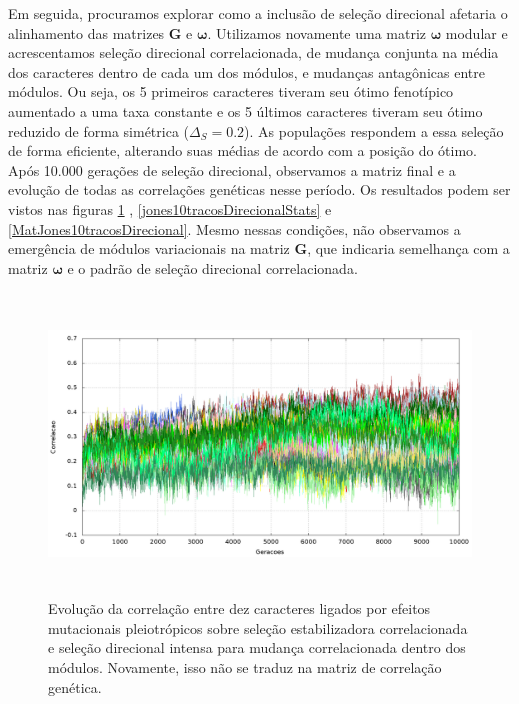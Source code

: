 Em seguida, procuramos explorar como a inclusão de seleção direcional afetaria o
alinhamento das matrizes $\mathbf{G}$ e $\pmb{\omega}$.
Utilizamos novamente uma matriz $\pmb{\omega}$ modular e acrescentamos seleção
direcional correlacionada, de mudança conjunta na média dos caracteres
dentro de cada um dos módulos, e mudanças antagônicas entre módulos.
Ou seja, os 5 primeiros caracteres tiveram seu ótimo fenotípico aumentado a
uma taxa constante e os 5 últimos caracteres tiveram seu ótimo reduzido de
forma simétrica ($\Delta_S=0.2$).
As populações respondem a essa seleção de forma eficiente, alterando
suas médias de acordo com a posição do ótimo.
Após 10.000 gerações de seleção direcional, observamos a matriz final
e a evolução de todas as correlações genéticas nesse período.
Os resultados podem ser vistos nas figuras \ref{jones10tracosDirecional}
, \ref{jones10tracosDirecionalStats} e \ref{MatJones10tracosDirecional}.
Mesmo nessas condições, não observamos a emergência de módulos
variacionais na matriz $\mathbf{G}$, que indicaria semelhança com a matriz $\pmb{\omega}$
e o padrão de seleção direcional correlacionada.

\begin{figure}[htbp]
    \centering
    \includegraphics[width=150mm, height=80mm]{figuras/jones10tracosDirecional.png}
    \caption{Evolução da correlação entre dez caracteres ligados por efeitos
        mutacionais pleiotrópicos sobre seleção estabilizadora correlacionada
        e seleção direcional intensa para mudança correlacionada dentro dos
    módulos. Novamente, isso não se traduz na matriz de correlação genética.}
    \label{jones10tracosDirecional}
\end{figure}

